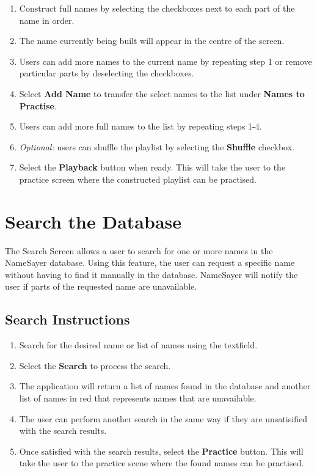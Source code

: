 \documentclass{article}
\begin{document}
\begin{enumerate}
	\item Construct full names by selecting the checkboxes next to each part of
	the name in order.

	\item The name currently being built will appear in the centre of the
	screen.

	\item Users can add more names to the current name by repeating step 1 or
	remove particular parts by deselecting the checkboxes.

	\item Select \textbf{Add Name} to transfer the select names to the list
	under \textbf{Names to Practise}.

	\item Users can add more full names to the list by repeating steps 1-4.

	\item {\em Optional: } users can shuffle the playlist by selecting the
	\textbf{Shuffle} checkbox.

	\item Select the \textbf{Playback} button when ready. This will take the
	user to the practice screen where the constructed playlist can be practised.

\end{enumerate}

\section{Search the Database}
The Search Screen allows a user to search for one or more names in the NameSayer
database. Using this feature, the user can request a specific name without
having to find it manually in the database. NameSayer will notify the user if
parts of the requested name are unavailable.

\subsection{Search Instructions}

\begin{enumerate}
	\item Search for the desired name or list of names using the textfield.

	\item Select the \textbf{Search} to process the search.

	\item The application will return a list of names found in the database and
	another list of names in red that represents names that are unavailable.

	\item The user can perform another search in the same way if they are
	unsatisified with the search results.

	\item Once satisfied with the search results, select the \textbf{Practice}
	button. This will take the user to the practice scene where the found names
	can be practised.

\end{enumerate}
\end{document}

